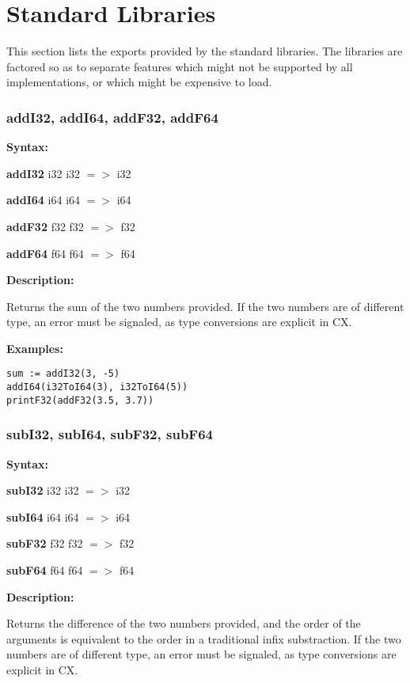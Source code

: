 \chapter{Standard Libraries}
\label{stdlibraries}


This section lists the exports provided by the standard libraries.  The
libraries are factored so as to separate features which might not be
supported by all implementations, or which might be expensive to load.

\subsection{addI32, addI64, addF32, addF64}

\textbf{Syntax:}

\textbf{addI32} i32 i32 $=>$ i32

\textbf{addI64} i64 i64 $=>$ i64

\textbf{addF32} f32 f32 $=>$ f32

\textbf{addF64} f64 f64 $=>$ f64

\textbf{Description:}

Returns the sum of the two numbers provided. If the two numbers are of
different type, an error must be signaled, as type conversions are
explicit in CX.

\textbf{Examples:}

\begin{lstlisting}
sum := addI32(3, -5)
addI64(i32ToI64(3), i32ToI64(5))
printF32(addF32(3.5, 3.7))
\end{lstlisting}

\subsection{subI32, subI64, subF32, subF64}

\textbf{Syntax:}

\textbf{subI32} i32 i32 $=>$ i32

\textbf{subI64} i64 i64 $=>$ i64

\textbf{subF32} f32 f32 $=>$ f32

\textbf{subF64} f64 f64 $=>$ f64

\textbf{Description:}

Returns the difference of the two numbers provided, and the order of
the arguments is equivalent to the order in a traditional infix
substraction. If the two numbers are of different type, an error must
be signaled, as type conversions are explicit in CX.

